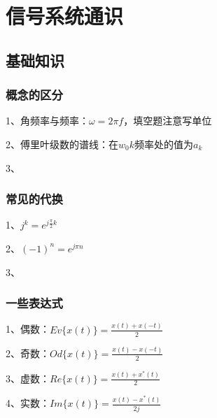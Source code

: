 \chapter{信号系统通识}

\section{基础知识}



\subsection{概念的区分}

1、角频率与频率：$\omega = 2 \pi f$，填空题注意写单位

2、傅里叶级数的谱线：在$w_0k$频率处的值为$a_k$

3、



\subsection{常见的代换}

1、$j^k = e^{j\frac{\pi}{2}k}$

2、$(-1)^n = e^{j\pi n}$

3、



\subsection{一些表达式}

1、偶数：$Ev\{x(t)\}=\frac{x(t)+x(-t)}{2}$

2、奇数：$Od\{x(t)\}=\frac{x(t)-x(-t)}{2}$

3、虚数：$Re\{x(t)\}=\frac{x(t)+x^*(t)}{2}$

4、实数：$Im\{x(t)\}=\frac{x(t)-x^*(t)}{2j}$

